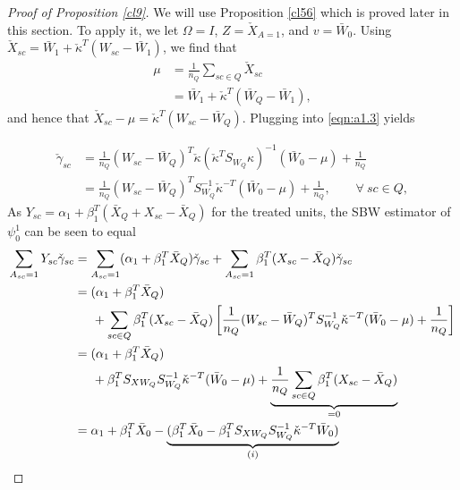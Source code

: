 \begin{proof}[Proof of Proposition \ref{cl9}]

We will use Proposition \ref{cl56} which is proved later in this section. To apply it, we let $\Omega = I$, $Z = \check{X}_{A=1}$, and $v = \bar{W}_0$. Using  $\check{X}_{sc} = \bar{W}_1 + \check{\kappa}^T(W_{sc} - \bar{W}_1)$, we find that 
\begin{align}
    \nonumber \mu & = \frac{1}{n_Q} \sum_{sc \in Q} \check{X}_{sc} \\
    \label{eqn:cl9.mu} & = \bar{W}_1 + \check{\kappa}^T(\bar{W}_Q - \bar{W}_1),
\end{align}
and hence that $\check{X}_{sc} - \mu = \check{\kappa}^T(W_{sc} - \bar{W}_Q)$. Plugging into \eqref{eqn:a1.3} yields 

\begin{align}
 \nonumber \check{\gamma}_{sc} & = \frac{1}{n_Q}(W_{sc} - \bar{W}_Q)^T \check{\kappa} (\check{\kappa}^T S_{W_Q} \kappa)^{-1}(\bar{W}_0 - \mu) + \frac{1}{n_Q} \\
 \label{eqn:cl9.proof.gamma}& = \frac{1}{n_Q}(W_{sc} - \bar{W}_Q)^T S_{W_Q}^{-1} \check{\kappa}^{-T}(\bar{W}_0 - \mu) + \frac{1}{n_Q}, \qquad \forall \ sc \in Q,
\end{align}
As $Y_{sc} = \alpha_1 + \beta_1^T (\bar{X}_Q + X_{sc} - \bar{X}_Q)$ for the treated units, the SBW estimator of $\psi_0^1$ can be seen to equal
\begin{align}
    \nonumber \sum_{A_{sc}=1} Y_{sc}\check{\gamma}_{sc} & = \sum_{A_{sc}=1} (\alpha_1 + \beta_1^T \bar{X}_Q) \check{\gamma}_{sc} + \sum_{A_{sc}=1}  \beta_1^T (X_{sc} - \bar{X}_Q)\check{\gamma}_{sc} \\
 \label{eqn:cl9.proof1}    & = (\alpha_1 + \beta_1^T \bar{X}_Q)\\
    \nonumber & \hskip.5cm {} + \sum_{sc \in Q}  \beta_1^T(X_{sc} - \bar{X}_Q)\left[\frac{1}{n_Q} (W_{sc} - \bar{W}_Q)^T S_{W_Q}^{-1} \check{\kappa}^{-T}(\bar{W}_0 - \mu) +  \frac{1}{n_Q}\right] \\
\label{eqn:cl9.proof2}    & = (\alpha_1 + \beta_1^T \bar{X}_Q)\\
    \nonumber & \hskip.5cm {} +  \beta_1^TS_{XW_Q} S_{W_Q}^{-1} \check{\kappa}^{-T}(\bar{W}_0 - \mu) + \underbrace{\frac{1}{n_Q}\sum_{sc \in Q}   \beta_1^T (X_{sc} - \bar{X}_Q) }_{= 0} \\ %
\label{eqn:cl9.proof3}    & = \alpha_1 + \beta_1^T \bar{X}_0 - \underbrace{(\beta_1^T \bar{X}_0 -  \beta_1^TS_{XW_Q} S_{W_Q}^{-1} \check{\kappa}^{-T}\bar{W}_0)}_{(i)} \\

\end{align}
\end{proof}
